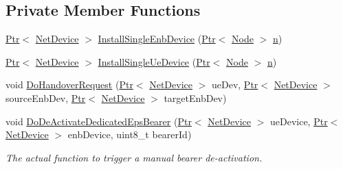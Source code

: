 \subsection*{Private Member Functions}
\begin{DoxyCompactItemize}
\item 
\hyperlink{classns3_1_1Ptr}{Ptr}$<$ \hyperlink{classns3_1_1NetDevice}{Net\+Device} $>$ \hyperlink{classns3_1_1LteHelper_afac168014c3a4ac5c30bfd7c1d09cb96}{Install\+Single\+Enb\+Device} (\hyperlink{classns3_1_1Ptr}{Ptr}$<$ \hyperlink{classns3_1_1Node}{Node} $>$ \hyperlink{lte__link__budget__x2__handover__measures_8m_abdb05bc5a064cf642a06c83b3392f148}{n})
\item 
\hyperlink{classns3_1_1Ptr}{Ptr}$<$ \hyperlink{classns3_1_1NetDevice}{Net\+Device} $>$ \hyperlink{classns3_1_1LteHelper_afa6e13db5742241f48f8f4b8533b67f6}{Install\+Single\+Ue\+Device} (\hyperlink{classns3_1_1Ptr}{Ptr}$<$ \hyperlink{classns3_1_1Node}{Node} $>$ \hyperlink{lte__link__budget__x2__handover__measures_8m_abdb05bc5a064cf642a06c83b3392f148}{n})
\item 
void \hyperlink{classns3_1_1LteHelper_a661acc2815ed08300d99d6f2975a8e5a}{Do\+Handover\+Request} (\hyperlink{classns3_1_1Ptr}{Ptr}$<$ \hyperlink{classns3_1_1NetDevice}{Net\+Device} $>$ ue\+Dev, \hyperlink{classns3_1_1Ptr}{Ptr}$<$ \hyperlink{classns3_1_1NetDevice}{Net\+Device} $>$ source\+Enb\+Dev, \hyperlink{classns3_1_1Ptr}{Ptr}$<$ \hyperlink{classns3_1_1NetDevice}{Net\+Device} $>$ target\+Enb\+Dev)
\item 
void \hyperlink{classns3_1_1LteHelper_a37191ff2588990d2fc56466ba8a081e9}{Do\+De\+Activate\+Dedicated\+Eps\+Bearer} (\hyperlink{classns3_1_1Ptr}{Ptr}$<$ \hyperlink{classns3_1_1NetDevice}{Net\+Device} $>$ ue\+Device, \hyperlink{classns3_1_1Ptr}{Ptr}$<$ \hyperlink{classns3_1_1NetDevice}{Net\+Device} $>$ enb\+Device, uint8\+\_\+t bearer\+Id)
\begin{DoxyCompactList}\small\item\em The actual function to trigger a manual bearer de-\/activation. \end{DoxyCompactList}\end{DoxyCompactItemize}

